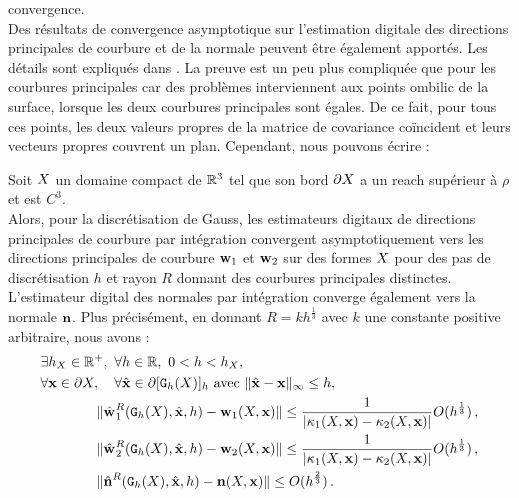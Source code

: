 convergence.
%
\\
%
Des résultats de convergence asymptotique sur l'estimation digitale des
directions principales de courbure et de la normale peuvent être également
apportés. Les détails sont expliqués dans \cite{ChapterIICurvature}. La preuve
est un peu plus compliquée que pour les courbures principales car des problèmes
interviennent aux points ombilic de la surface, \cad lorsque les deux courbures
principales sont égales. De ce fait, pour tous ces points, les deux valeurs
propres de la matrice de covariance coïncident et leurs vecteurs propres
couvrent un plan. Cependant, nous pouvons écrire :
%
\begin{theorem}
\label{thm:multigrid-conv-principal-directions-and-normal}
  Soit $X$ un domaine compact de $\mathbb{R}^3$ tel que son bord $\partial X$ a un
  reach supérieur à $\rho$ et est $C^3$.
  \\
  Alors, pour la discrétisation de Gauss, les estimateurs digitaux de directions
  principales de courbure par intégration convergent asymptotiquement vers les
  directions principales de courbure $\mathbf{w}_{1}$ et $\mathbf{w}_{2}$ sur des
  formes $X$ pour des pas de discrétisation $h$ et rayon $R$ donnant des
  courbures principales distinctes. L'estimateur digital des normales par
  intégration converge également vers la normale $\mathbf{n}$. Plus précisément,
  en donnant $R=k h^{\frac{1}{3}}$ avec $k$ une constante positive arbitraire,
  nous avons :
  \begin{align}
    &\exists h_{X} \in \mathbb{R}^+,\,\, \forall h \in \mathbb{R},\,\, 0 < h < h_{X},\,\,
     \,\,\nonumber\quad \quad\quad \quad\\
    &\forall \mathbf{x} \in \partial X, \quad \forall \hat{\mathbf{x}} \in \partial \lbrack \mathtt{G}_{h}(X) \rbrack_{h}  \text{~avec~} \| \hat{\mathbf{x}} -\mathbf{x}\|_\infty
    \le h, \nonumber\quad \quad\quad \quad \\
    &\quad \quad\quad \quad\| \hat{\mathbf{w}_{}}_{1}^{R}( \mathtt{G}_{h}(X), \hat{\mathbf{x}}, h ) - \mathbf{w}_{1}(X, \mathbf{x}) \|
    \le \frac{1}{|\kappa_{1}(X,\mathbf{x})-\kappa_{2}(X,\mathbf{x})|} O(h^{\frac{1}{3}})\,, \\
    &\quad \quad\quad \quad\| \hat{\mathbf{w}_{}}_{2}^{R}( \mathtt{G}_{h}(X), \hat{\mathbf{x}}, h ) - \mathbf{w}_{2}(X, \mathbf{x}) \|
    \le \frac{1}{|\kappa_{1}(X,\mathbf{x})-\kappa_{2}(X,\mathbf{x})|} O(h^{\frac{1}{3}})\,, \\
    &\quad \quad\quad \quad\| \hat{\mathbf{n}{}}^{R}( \mathtt{G}_{h}(X), \hat{\mathbf{x}}, h ) - \mathbf{n}(X, \mathbf{x}) \|
    \le O(h^{\frac{2}{3}})\,.
  \end{align}
\end{theorem}
